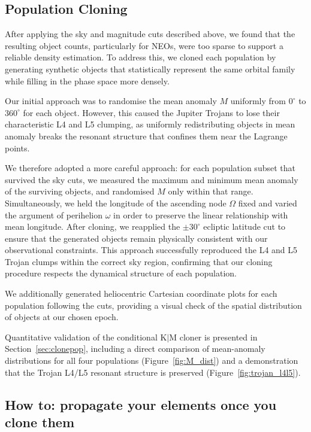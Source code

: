 \documentclass[linenumbers,trackchanges,twocolumn]{aastex701}
\begin{document}
\subsection{Population Cloning}
\label{sec:cloneast}

After applying the sky and magnitude cuts described above, we found that the resulting object counts, particularly for NEOs, were too sparse to support a reliable density estimation. To address this, we cloned each population by generating synthetic objects that statistically represent the same orbital family while filling in the phase space more densely.

Our initial approach was to randomise the mean anomaly \( M \) uniformly from \( 0^\circ \) to \( 360^\circ \) for each object. However, this caused the Jupiter Trojans to lose their characteristic L4 and L5 clumping, as uniformly redistributing objects in mean anomaly breaks the resonant structure that confines them near the Lagrange points.

We therefore adopted a more careful approach: for each population subset that survived the sky cuts, we measured the maximum and minimum mean anomaly of the surviving objects, and randomised \( M \) only within that range. Simultaneously, we held the longitude of the ascending node \( \Omega \) fixed and varied the argument of perihelion \( \omega \) in order to preserve the linear relationship with mean longitude. After cloning, we reapplied the \( \pm 30^\circ \) ecliptic latitude cut to ensure that the generated objects remain physically consistent with our observational constraints. This approach successfully reproduced the L4 and L5 Trojan clumps within the correct sky region, confirming that our cloning procedure respects the dynamical structure of each population.

We additionally generated heliocentric Cartesian coordinate plots for each population following the cuts, providing a visual check of the spatial distribution of objects at our chosen epoch.

Quantitative validation of the conditional K$|$M cloner is presented in Section~\ref{sec:clonepop}, including a direct comparison of mean-anomaly distributions for all four populations (Figure~\ref{fig:M_dist}) and a demonstration that the Trojan L4/L5 resonant structure is preserved (Figure~\ref{fig:trojan_l4l5}).



\subsection{How to: propagate your elements once you clone them}
\label{sec:propagation}
\end{document}
